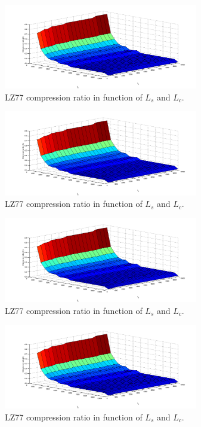 \begin{center}
\begin{figure}[H]
\includegraphics[width=8.5cm]{images/rep_surf.png}
\caption{LZ77 compression ratio in function of $L_s$ and $L_c$.}
\end{figure}
\end{center}

\begin{center}
\begin{figure}[H]
\includegraphics[width=8.5cm]{images/rep_surf.png}
\caption{LZ77 compression ratio in function of $L_s$ and $L_c$.}
\end{figure}
\end{center}

\begin{center}
\begin{figure}[H]
\includegraphics[width=8.5cm]{images/rep_surf.png}
\caption{LZ77 compression ratio in function of $L_s$ and $L_c$.}
\end{figure}
\end{center}

\begin{center}
\begin{figure}[H]
\includegraphics[width=8.5cm]{images/rep_surf.png}
\caption{LZ77 compression ratio in function of $L_s$ and $L_c$.}
\end{figure}
\end{center}

